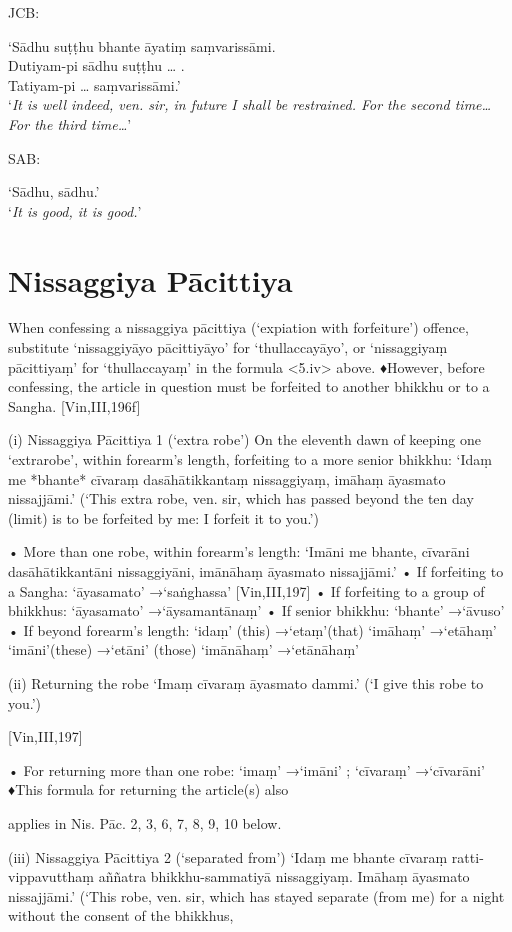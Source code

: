 JCB:

‘Sādhu suṭṭhu bhante āyatiṃ saṃvarissāmi.\\
Dutiyam-pi sādhu suṭṭhu … .\\
Tatiyam-pi … saṃvarissāmi.’\\
‘\emph{It is well indeed, ven. sir, in future I shall be restrained. For the second time… For the third time…}’

SAB:

‘Sādhu, sādhu.’\\
‘\emph{It is good, it is good.}’


\section{Nissaggiya Pācittiya}

When confessing a nissaggiya pācittiya (‘expiation with forfeiture’) offence, substitute ‘nissaggiyāyo pācittiyāyo’ for ‘thullaccayāyo’, or
‘nissaggiyaṃ pācittiyaṃ’ for ‘thullaccayaṃ’ in
the formula <5.iv> above.
♦However, before confessing, the article in
question must be forfeited to another bhikkhu
or to a Sangha.
[Vin,III,196f]

(i) Nissaggiya Pācittiya 1 (‘extra robe’)
On the eleventh dawn of keeping one ‘extrarobe’, within forearm's length, forfeiting to a
more senior bhikkhu:
‘Idaṃ me *bhante* cīvaraṃ dasāhātikkantaṃ
nissaggiyaṃ, imāhaṃ āyasmato nissajjāmi.’
(‘This extra robe, ven. sir, which has passed beyond the
ten day (limit) is to be forfeited by me: I forfeit it to you.’)

• More than one robe, within forearm's
length:
‘Imāni me bhante, cīvarāni dasāhātikkantāni
nissaggiyāni, imānāhaṃ āyasmato nissajjāmi.’
• If forfeiting to a Sangha:
‘āyasamato’ →‘saṅghassa’ [Vin,III,197]
• If forfeiting to a group of bhikkhus:
‘āyasamato’ →‘āysamantānaṃ’
• If senior bhikkhu: ‘bhante’ →‘āvuso’
• If beyond forearm's length:
‘idaṃ’ (this) →‘etaṃ’(that)
‘imāhaṃ’ →‘etāhaṃ’
‘imāni’(these) →‘etāni’ (those)
‘imānāhaṃ’ →‘etānāhaṃ’

(ii) Returning the robe
‘Imaṃ cīvaraṃ āyasmato dammi.’
(‘I give this robe to you.’)

[Vin,III,197]

• For returning more than one robe:
‘imaṃ’ →‘imāni’ ; ‘cīvaraṃ’ →‘cīvarāni’
♦This formula for returning the article(s) also

applies in Nis. Pāc. 2, 3, 6, 7, 8, 9, 10 below.

(iii) Nissaggiya Pācittiya 2 (‘separated from’)
‘Idaṃ me bhante cīvaraṃ ratti-vippavutthaṃ
aññatra bhikkhu-sammatiyā nissaggiyaṃ.
Imāhaṃ āyasmato nissajjāmi.’
(‘This robe, ven. sir, which has stayed separate (from
me) for a night without the consent of the bhikkhus,

